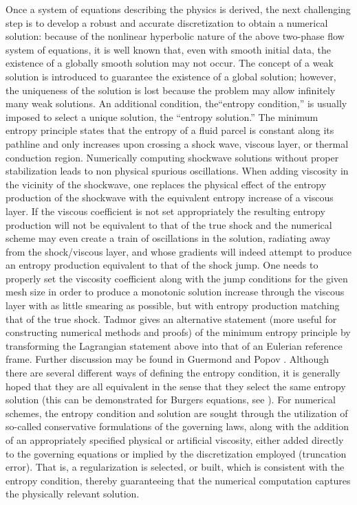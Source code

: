 \documentclass[preprint,10pt]{elsarticle}
\begin{document}
Once a system of equations describing the physics is derived, the next challenging step is to develop a robust and accurate discretization to obtain a numerical solution: because of the nonlinear hyperbolic nature of the above two-phase flow system of equations, it is well known that, even with smooth initial data, the existence of a 
globally smooth solution may not occur. The concept of a weak
solution is introduced to guarantee the existence of a global solution; however, the uniqueness of the solution is lost because the problem may
allow infinitely many weak solutions.  An additional condition, the``entropy condition,'' is usually imposed to select a
unique solution, the ``entropy solution.'' The minimum entropy principle states that the entropy of a fluid parcel is constant along its pathline
and only increases upon crossing a shock wave, viscous layer, or thermal conduction region.  Numerically computing 
shockwave solutions without proper stabilization leads to non physical spurious oscillations. When adding viscosity in the vicinity 
of the shockwave, one replaces the physical effect of the entropy production of the shockwave with the equivalent entropy increase of a viscous layer.  
If the viscous coefficient is not set appropriately 
the resulting entropy production will not be equivalent to that of the true shock and the numerical scheme %
may even create a train of 
oscillations in the solution, radiating away from the shock/viscous layer, and whose gradients will indeed attempt to produce an entropy production equivalent 
to that of the shock jump. One needs to properly set the viscosity coefficient along with the jump conditions for the given mesh size in order 
to produce a monotonic solution increase through the viscous layer with as little smearing as possible, but with entropy production matching that of the true shock.
Tadmor \cite{tadmor_minimum_entropy_principle} gives an alternative statement (more useful for constructing numerical methods and proofs) of the minimum 
entropy principle by transforming the Lagrangian statement above into that of an Eulerian reference frame. Further discussion may be found in Guermond and Popov \cite{jlg}.
Although there are several different ways of defining the entropy condition, it is generally hoped that they are all equivalent in the sense 
that they select the same entropy solution (this can be demonstrated for Burgers equations, see \cite{Evans1998,Lellis_minimalentropy}).
For numerical schemes, the entropy condition and solution are sought through the utilization of so-called conservative formulations of the 
governing laws, along with the addition of an appropriately specified physical or artificial viscosity, either added directly to the governing 
equations or implied by the discretization employed (truncation error).  That is, a regularization is selected, or built, which is consistent with the 
entropy condition, thereby guaranteeing that the numerical computation captures the physically relevant solution.  
\end{document}
